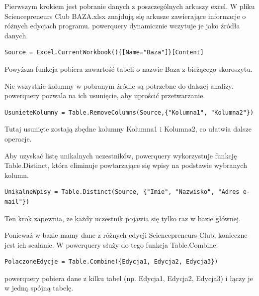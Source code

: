 Pierwszym krokiem jest pobranie danych z poszczególnych arkuszy \gls{excel}. W pliku Sciencepreneurs Club BAZA.xlsx znajdują się arkusze zawierające informacje o różnych edycjach programu. \gls{powerquery} dynamicznie wczytuje je jako źródła danych.

\begin{lstlisting}[language=PowerQueryM, caption=Kod ładowania arkusza do Power Query w języku M źródło: opracowanie własne]
Source = Excel.CurrentWorkbook(){[Name="Baza"]}[Content]
\end{lstlisting}

Powyższa funkcja pobiera zawartość tabeli o nazwie Baza z bieżącego skoroszytu.

Nie wszystkie kolumny w pobranym źródle są potrzebne do dalszej analizy. \gls{powerquery} pozwala na ich usunięcie, aby uprościć przetwarzanie.

\begin{lstlisting}[language=PowerQueryM, caption=Kod usuwania niepotrzebnych kolumn w Power Query w języku M źródło: opracowanie własne]
UsunieteKolumny = Table.RemoveColumns(Source,{"Kolumna1", "Kolumna2"})
\end{lstlisting}
Tutaj usunięte zostają zbędne kolumny Kolumna1 i Kolumna2, co ułatwia dalsze operacje.

Aby uzyskać listę unikalnych uczestników, \gls{powerquery} wykorzystuje funkcję Table.Distinct, która eliminuje powtarzające się wpisy na podstawie wybranych kolumn.

\begin{lstlisting}[language=PowerQueryM, caption=Kod usuwania duplikatów – tworzenie listy unikalnych uczestników w Power Query w języku M źródło: opracowanie własne]
UnikalneWpisy = Table.Distinct(Source, {"Imie", "Nazwisko", "Adres e-mail"})
\end{lstlisting}
Ten krok zapewnia, że każdy uczestnik pojawia się tylko raz w bazie głównej.

Ponieważ w bazie mamy dane z różnych edycji Sciencepreneurs Club, konieczne jest ich scalanie. W \gls{powerquery} służy do tego funkcja Table.Combine.

\begin{lstlisting}[language=PowerQueryM, caption=Kod scalający dane z różnych edycji w Power Query w języku M źródło: opracowanie własne]
PolaczoneEdycje = Table.Combine({Edycja1, Edycja2, Edycja3})
\end{lstlisting}

\gls{powerquery} pobiera dane z kilku tabel (np. Edycja1, Edycja2, Edycja3) i łączy je w jedną spójną tabelę.

